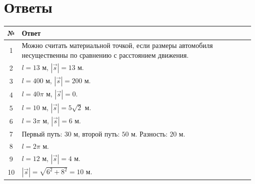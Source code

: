 \documentclass[a4paper,12pt]{article}
\begin{document}

\newpage

\section*{Ответы}

\begin{center}
\renewcommand{\arraystretch}{1.35}

\begin{tabularx}{\linewidth}{@{}cX@{}}
\toprule
№ & Ответ\\
\midrule

1 &
Можно считать материальной точкой,
если размеры автомобиля несущественны
по сравнению с расстоянием движения.\\

2 &
$l=13$ м,
$|\vec{s}|=13$ м.\\

3 &
$l=400$ м,
$|\vec{s}|=200$ м.\\

4 &
$l=40\pi$ м,
$|\vec{s}|=0$.\\

5 &
$l=10$ м,
$|\vec{s}|=5\sqrt{2}$ м.\\

6 &
$l=3\pi$ м,
$|\vec{s}|=6$ м.\\

7 &
Первый путь: $30$ м,
второй путь: $50$ м.
Разность: $20$ м.\\

8 &
$l=2\pi$ м.\\

9 &
$l=12$ м,
$|\vec{s}|=4$ м.\\

10 &
$|\vec{s}|=\sqrt{6^2+8^2}=10$ м.\\

\bottomrule
\end{tabularx}
\end{center}
\end{document}
